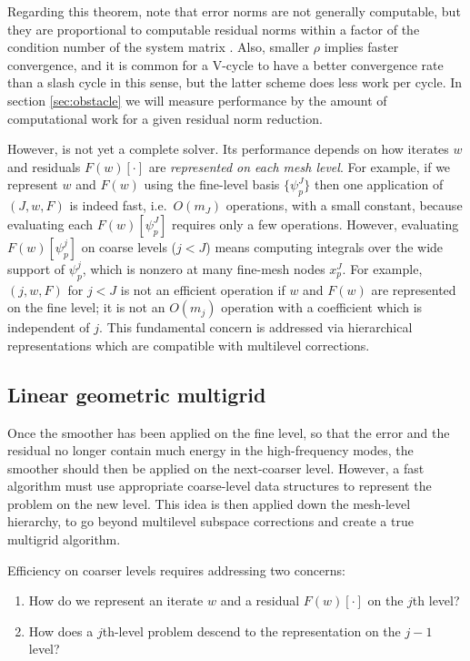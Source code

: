 \documentclass[letterpaper,final,12pt,reqno]{amsart}
\theoremstyle{claim}
\numberwithin{equation}{section}
\numberwithin{figure}{section}
\numberwithin{table}{section}
\numberwithin{theorem}{section}
\begin{document}
Regarding this theorem, note that error norms are not generally computable, but they are proportional to computable residual norms within a factor of the condition number of the system matrix \cite[Chapter 2]{Bueler2016}.  Also, smaller $\rho$ implies faster convergence, and it is common for a V-cycle to have a better convergence rate than a slash cycle in this sense, but the latter scheme does less work per cycle.  In section \ref{sec:obstacle} we will measure performance by the amount of computational work for a given residual norm reduction.

However,  is not yet a complete solver.  Its performance depends on how iterates $w$ and residuals $F(w)[\cdot]$ are \emph{represented on each mesh level}.  For example, if we represent $w$ and $F(w)$ using the fine-level basis $\{\psi_p^J\}$ then one application of $(J,w,F)$ is indeed fast, i.e.~$O(m_J)$ operations, with a small constant, because evaluating each $F(w)[\psi_p^J]$ requires only a few operations.  However, evaluating $F(w)[\psi_p^j]$ on coarse levels ($j<J$) means computing integrals over the wide support of $\psi_p^j$, which is nonzero at many fine-mesh nodes $x_p^J$.  For example, $(j,w,F)$ for $j<J$ is not an efficient operation if $w$ and $F(w)$ are represented on the fine level; it is not an $O(m_j)$ operation with a coefficient which is independent of $j$.  This fundamental concern is addressed via hierarchical representations which are compatible with multilevel corrections.

\subsection*{Linear geometric multigrid}  Once the smoother has been applied on the fine level, so that the error and the residual no longer contain much energy in the high-frequency modes, the smoother should then be applied on the next-coarser level.  However, a fast algorithm must use appropriate coarse-level data structures to represent the problem on the new level.  This idea is then applied down the mesh-level hierarchy, to go beyond multilevel subspace corrections and create a true multigrid algorithm.

Efficiency on coarser levels requires addressing two concerns:
\renewcommand{\labelenumi}{\emph{\roman{enumi})}}
\begin{enumerate}
\item How do we represent an iterate $w$ and a residual $F(w)[\cdot]$ on the $j$th level?
\item How does a $j$th-level problem descend to the representation on the $j-1$ level?
\end{enumerate}
\end{document}
